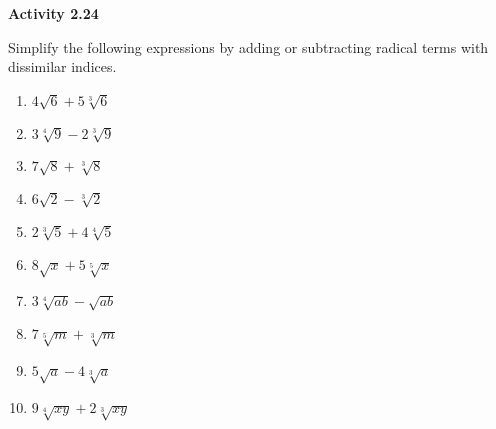 \vspace{1ex}
\noindent\textbf{Activity 2.24}

\vspace{0.75ex}

Simplify the following expressions by adding or subtracting radical terms with dissimilar indices.

\begin{multicols}{2}
\begin{enumerate}[noitemsep, label = \color{blue}\arabic*. ]
    \item $4\sqrt{6} + 5\sqrt[{\scriptstyle 3}]{6}$
    \item $3\sqrt[{\scriptstyle 4}]{9} - 2\sqrt[{\scriptstyle 3}]{9}$
    \item $7\sqrt{8} + \sqrt[{\scriptstyle 3}]{8}$
    \item $6\sqrt{2} - \sqrt[{\scriptstyle 3}]{2}$
    \item $2\sqrt[{\scriptstyle 3}]{5} + 4\sqrt[{\scriptstyle 4}]{5}$
    \item $8\sqrt{x} + 5\sqrt[{\scriptstyle 5}]{x}$
    \item $3\sqrt[{\scriptstyle 4}]{ab} - \sqrt{ab}$
    \item $7\sqrt[{\scriptstyle 5}]{m} + \sqrt[{\scriptstyle 3}]{m}$
    \item $5\sqrt{a} - 4\sqrt[{\scriptstyle 3}]{a}$
    \item $9\sqrt[{\scriptstyle 4}]{xy} + 2\sqrt[{\scriptstyle 3}]{xy}$
\end{enumerate}
\end{multicols}

